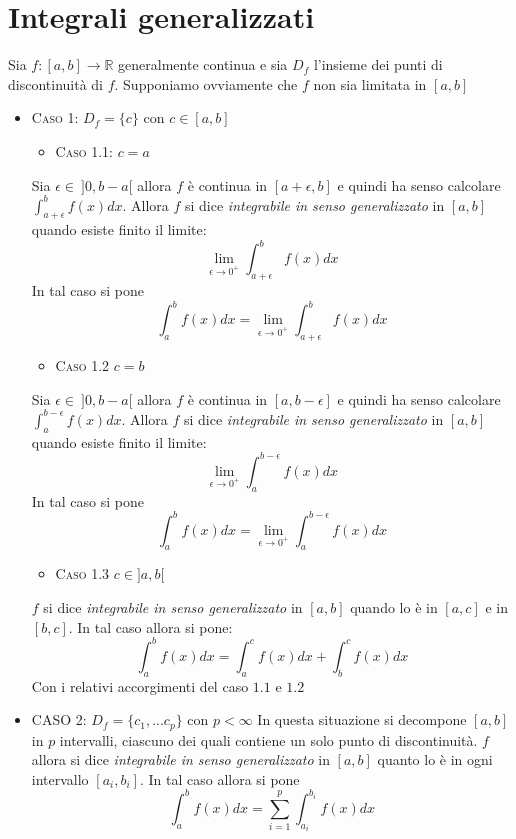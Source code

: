 \documentclass[12pt]{article}
\newcommand{\R}{\mathbb{R}}
\begin{document}
\section{Integrali generalizzati}
Sia $f: [a,b] \to \R$ generalmente continua e sia $D_f$ l'insieme dei punti di discontinuità di $f$. Supponiamo ovviamente che $f$ non sia limitata in $[a,b]$
\begin{itemize}
    \item \textsc{Caso 1}: $D_f = \{c\}$ con $c\in [a,b]$
    \begin{itemize}
          \item \textsc{Caso 1.1}: $c=a$ 
    \end{itemize}
Sia $\epsilon \in ~ ]0,b-a[$ allora $f$ è continua in $[a + \epsilon,b]$ e quindi ha senso calcolare $\displaystyle \int_{a + \epsilon}^b f(x) dx$. Allora $f$ si dice \emph{integrabile in senso generalizzato} in $[a,b]$ quando esiste finito il limite:
$$ \lim_{\epsilon \to 0^+} \int_{a + \epsilon}^b f(x) dx $$
In tal caso si pone
$$ \int_{a}^b f(x) dx = \lim_{\epsilon \to 0^+} \int_{a + \epsilon}^b f(x) dx $$

\begin{itemize}
    \item \textsc{Caso 1.2} $c=b$
\end{itemize}
Sia $\epsilon \in ~ ]0,b-a[$ allora $f$ è continua in $[a,b - \epsilon]$ e quindi ha senso calcolare $\displaystyle \int_{a}^{b - \epsilon} f(x) dx$. Allora $f$ si dice \emph{integrabile in senso generalizzato} in $[a,b]$ quando esiste finito il limite:
$$ \lim_{\epsilon \to 0^+} \int_{a }^{b - \epsilon} f(x) dx $$
In tal caso si pone
$$ \int_{a}^b f(x) dx = \lim_{\epsilon \to 0^+} \int_{a }^{b - \epsilon} f(x) dx $$
\begin{itemize}
    \item \textsc{Caso 1.3} $c \in ]a,b[$
\end{itemize}
$f$ si dice \emph{integrabile in senso generalizzato} in $[a,b]$ quando lo è in $[a,c]$ e in $[b,c]$. In tal caso allora si pone:
$$ \int_{a}^b f(x) dx = \int_{a}^c f(x) dx + \int_{b}^c f(x) dx$$
Con i relativi accorgimenti del caso $1.1$ e $1.2$

\item \textsc{CASO 2:} $D_f = \{c_1, ... c_p\}$ con $p < \infty$
In questa situazione si decompone $[a,b]$ in $p$ intervalli, ciascuno dei quali contiene un solo punto di discontinuità. $f$ allora si dice \emph{integrabile in senso generalizzato} in $[a,b]$ quanto lo è in ogni intervallo $[a_i,b_i]$. In tal caso allora si pone
$$ \int_{a}^b f(x) dx = \sum_{i=1}^p \int_{a_i}^{b_i} f(x) dx$$
\end{itemize}
\end{document}
